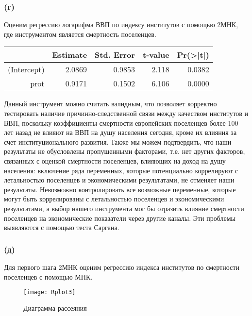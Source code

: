 \documentclass[a4paper,12pt]{article} %
\begin{document}
\newpage

\subsubsection*{(г)}	

Оценим регрессию логарифма ВВП по индексу институтов с помощью 2МНК, где инструментом является смертность  поселенцев.

\begin{table}[h!]
	\centering
	\begin{tabular}{rrrrr}
		\hline
		& Estimate & Std. Error & t-value & Pr(>|t|) \\ 
		\hline
		(Intercept) &  2.0869 &    0.9853 &  2.118 &  0.0382 \\ 
		prot & 0.9171  &   0.1502 &  6.106 & 0.0000 
		\\ 
		\hline
	\end{tabular}
\end{table}	

 Данный
инструмент можно  считать валидным, что 
позволяет корректно тестировать наличие причинно-следственной
связи между качеством институтов и ВВП, поскольку коэффициенты смертности европейских поселенцев более 100 лет назад не влияют на ВВП на душу населения сегодня, кроме их влияния за счет институционального развития. 
Также мы можем подтвердить, что наши результаты не обусловлены пропущенными факторами, т.е. нет других факторов, связанных с оценкой смертности поселенцев, влияющих на доход на душу населения: 
включение ряда переменных, которые потенциально коррелируют с летальностью поселенцев и экономическими результатами, не  отменяет наши результаты.
Невозможно контролировать все возможные переменные, которые могут быть коррелированы с летальностью поселенцев и экономическими результатами, а выбор нашего инструмента мог бы отразить влияние смертности поселенцев на экономические показатели через  другие каналы. Эти проблемы выявляются   с помощью  теста  Саргана.
 

\subsubsection*{(д)}	

Для первого шага 2МНК  оценим регрессию индекса институтов по смертности поселенцев  с помощью МНК.


\begin{figure}[h!]
	\centering
	\texttt{[image: Rplot3]}
	\caption[Диаграмма рассеяния]{Диаграмма рассеяния}
	\label{fig:rplot1}
\end{figure}
\end{document}
